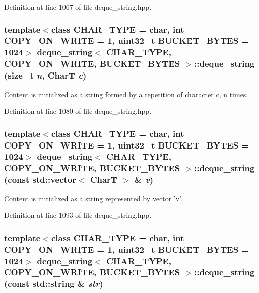 Definition at line 1067 of file deque\_\-string.hpp.\hypertarget{classdeque__string_f57f53bfcc45461c28703b910b9f2fc4}{
\subsubsection[{deque\_\-string}]{\setlength{\rightskip}{0pt plus 5cm}template$<$class CHAR\_\-TYPE  = char, int COPY\_\-ON\_\-WRITE = 1, uint32\_\-t BUCKET\_\-BYTES = 1024$>$ {\bf deque\_\-string}$<$ CHAR\_\-TYPE, COPY\_\-ON\_\-WRITE, BUCKET\_\-BYTES $>$::{\bf deque\_\-string} (size\_\-t {\em n}, \/  CharT {\em c})}}
\label{classdeque__string_f57f53bfcc45461c28703b910b9f2fc4}


Content is initialized as a string formed by a repetition of character c, n times. 

Definition at line 1080 of file deque\_\-string.hpp.\hypertarget{classdeque__string_333a103558350fad1dd0083f18c7cdbb}{
\subsubsection[{deque\_\-string}]{\setlength{\rightskip}{0pt plus 5cm}template$<$class CHAR\_\-TYPE  = char, int COPY\_\-ON\_\-WRITE = 1, uint32\_\-t BUCKET\_\-BYTES = 1024$>$ {\bf deque\_\-string}$<$ CHAR\_\-TYPE, COPY\_\-ON\_\-WRITE, BUCKET\_\-BYTES $>$::{\bf deque\_\-string} (const std::vector$<$ CharT $>$ \& {\em v})}}
\label{classdeque__string_333a103558350fad1dd0083f18c7cdbb}


Content is initialized as a string represented by vector 'v'. 

Definition at line 1093 of file deque\_\-string.hpp.\hypertarget{classdeque__string_e7bf748ddc74ec3fab236086a9087dce}{
\subsubsection[{deque\_\-string}]{\setlength{\rightskip}{0pt plus 5cm}template$<$class CHAR\_\-TYPE  = char, int COPY\_\-ON\_\-WRITE = 1, uint32\_\-t BUCKET\_\-BYTES = 1024$>$ {\bf deque\_\-string}$<$ CHAR\_\-TYPE, COPY\_\-ON\_\-WRITE, BUCKET\_\-BYTES $>$::{\bf deque\_\-string} (const std::string \& {\em str})}}
\label{classdeque__string_e7bf748ddc74ec3fab236086a9087dce}



